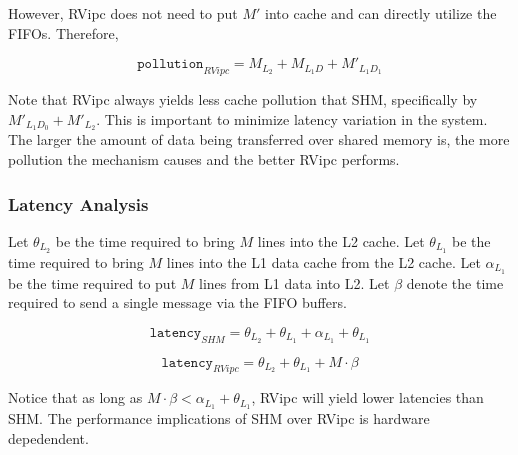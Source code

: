 However, RVipc does not need to put $M'$ into cache and can directly utilize the FIFOs. Therefore, 

\begin{equation}
  \texttt{pollution}_{RVipc} = M_{L_2} + M_{L_1D} + M'_{L_1D_1}
\end{equation}

Note that RVipc always yields less cache pollution that SHM, specifically by $M'_{L_1D_0} + M'_{L_2}$. This is important to minimize latency variation in the system. The larger the amount of data being transferred over shared memory is, the more pollution the mechanism causes and the better RVipc performs.

\subsubsection{Latency Analysis}
Let $\theta_{L_2}$ be the time required to bring $M$ lines into the L2 cache. Let $\theta_{L_1}$ be the time required to bring $M$ lines into the L1 data cache from the L2 cache. Let $\alpha_{L_1}$ be the time required to put $M$ lines from L1 data into L2. Let $\beta$ denote the time required to send a single message via the FIFO buffers.

\begin{equation}
  \texttt{latency}_{SHM} = \theta_{L_2} + \theta_{L_1} + \alpha_{L_1} + \theta_{L_1}
\end{equation}

\begin{equation}
  \texttt{latency}_{RVipc} = \theta_{L_2} + \theta_{L_1} + M \cdot \beta
\end{equation}

Notice that as long as $M \cdot \beta < \alpha_{L_1} + \theta_{L_1}$, RVipc will yield lower latencies than SHM. The performance implications of SHM over RVipc is hardware depedendent.
